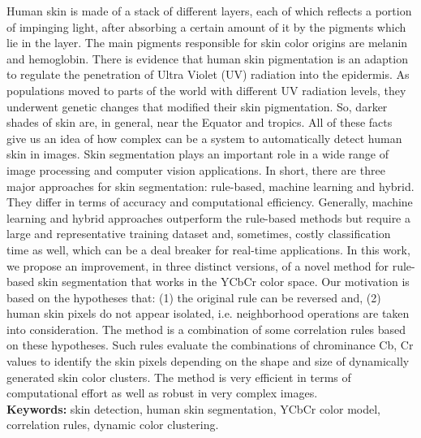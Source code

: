 \documentclass[12pt,twoside,a4paper]{book}
\theoremstyle{plain}
\theoremstyle{definition}
\begin{document}
Human skin is made of a stack of different layers, each of which reflects a portion of impinging light, after absorbing a certain amount of it by the pigments which lie in the layer. The main pigments responsible for skin color origins are melanin and hemoglobin. There is evidence that human skin pigmentation is an adaption to regulate the penetration of Ultra Violet (UV) radiation into the epidermis. As populations moved to parts of the world with different UV radiation levels, they underwent genetic changes that modified their skin pigmentation. So, darker shades of skin are, in general, near the Equator and tropics. All of these facts give us an idea of how complex can be a system to automatically detect human skin in images. Skin segmentation plays an important role in a wide range of image processing and computer vision applications. In short, there are three major approaches for skin segmentation: rule-based, machine learning and hybrid. They differ in terms of accuracy and computational efficiency. Generally, machine learning and hybrid approaches outperform the rule-based methods but require a large and representative training dataset and, sometimes, costly classification time as well, which can be a deal breaker for real-time applications. In this work, we propose an improvement, in three distinct versions, of a novel method for rule-based skin segmentation that works in the YCbCr color space. Our motivation is based on the hypotheses that: (1) the original rule can be reversed and, (2) human skin pixels do not appear isolated, i.e. neighborhood operations are taken into consideration. The method is a combination of some correlation rules based on these hypotheses. Such rules evaluate the combinations of chrominance Cb, Cr values to identify the skin pixels depending on the shape and size of dynamically generated skin color clusters. The method is very efficient in terms of computational effort as well as robust in very complex images.
\\

\noindent \textbf{Keywords:} skin detection, human skin segmentation, YCbCr color model, correlation rules, dynamic color clustering.

\tableofcontents    %

\end{document}
